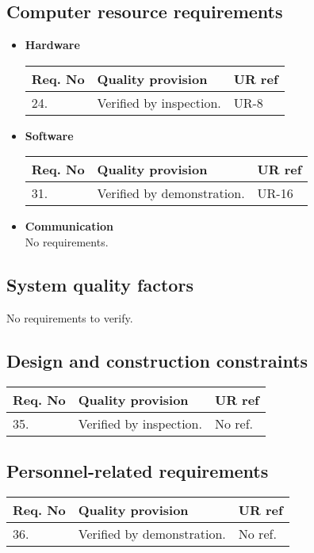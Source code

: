 \subsection{Computer resource requirements}
\begin{itemize}
\item \textbf{Hardware}
 	\begin{center}
   	\begin{tabular}{ | l | p{9cm} | l |}
    \hline
    Req. No & Quality provision  & UR ref \\ \hline
	24. & Verified by inspection.  								& UR-8 \\ \hline
    \hline
    \end{tabular}
	\end{center}
\item \textbf{Software}
 	\begin{center}
   	\begin{tabular}{ | l | p{9cm} | l |}
    \hline
    Req. No & Quality provision  & UR ref \\ \hline
    31. &Verified by demonstration. &UR-16\\
    \hline
    \end{tabular}
	\end{center}
\item \textbf{Communication}\\
No requirements.
\end{itemize}

\subsection{System quality factors}
No requirements to verify.

\subsection{Design and construction constraints}
\begin{center}
    \begin{tabular}{ | l | p{9cm} | l |}
    \hline
    Req. No & Quality provision  & UR ref \\ \hline
    35. & Verified by inspection. & No ref.\\ \hline
    \end{tabular}
\end{center}


\subsection{Personnel-related requirements}
\begin{center}
    \begin{tabular}{ | l | p{9cm} | l |}
    \hline
    Req. No & Quality provision  & UR ref \\ \hline
    36. & Verified by demonstration. & No ref. \\ \hline
    \end{tabular}
\end{center}


